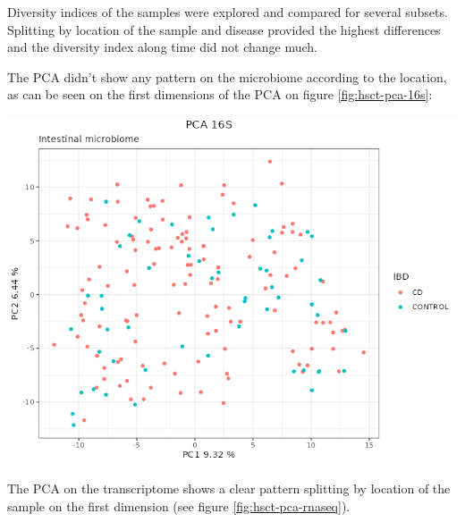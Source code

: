 \documentclass[
  12pt,
  a4paper,
  twoside,
  openright]{book}
\let\origfigure\figure
\let\endorigfigure\endfigure
\renewenvironment{figure}[1][2] {
    \expandafter\origfigure\expandafter[!htp]
} {
    \endorigfigure
}
\begin{document}
Diversity indices of the samples were explored and compared for several subsets.
Splitting by location of the sample and disease provided the highest differences and the diversity index along time did not change much.

The PCA didn't show any pattern on the microbiome according to the location, as can be seen on the first dimensions of the PCA on figure \ref{fig:hsct-pca-16s}:

\begin{figure}
\includegraphics[width=1\linewidth]{images/HSCT_PCA_16S} \caption[PCA of 16S data of the HSCT dataset.]{PCA of the 16S data of the HSCT dataset. Samples colored by location of the segment. There are no clear patterns according to the location.}\label{fig:hsct-pca-16s}
\end{figure}

The PCA on the transcriptome shows a clear pattern splitting by location of the sample on the first dimension (see figure \ref{fig:hsct-pca-rnaseq}).
\end{document}
